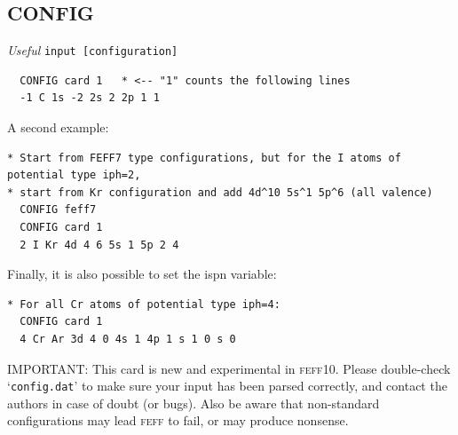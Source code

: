 \documentclass[11pt,oneside]{report} %
\newcommand{\program}[1]{\textsc{#1}}
\newcommand{\feff}{\program{feff}}
\newcommand{\vnum}{10}
\newcommand{\feffcur}{\feff\vnum}
\newenvironment{Card}[4]%
      {\vspace{3ex}%
        \subsection{#1}
        \quad\textsl{#3}\newline
        \quad\texttt{#2}\newline%
        \label{card:#4}\\}
      {}
\newcommand{\file}[1]{`\texttt{#1}'}
\begin{document}
\begin{Card}{CONFIG}{input [configuration]}{Useful}{cfg}
\begin{verbatim}
  CONFIG card 1   * <-- "1" counts the following lines
  -1 C 1s -2 2s 2 2p 1 1
\end{verbatim}
  A second example:
\begin{verbatim} 
* Start from FEFF7 type configurations, but for the I atoms of potential type iph=2, 
* start from Kr configuration and add 4d^10 5s^1 5p^6 (all valence)
  CONFIG feff7
  CONFIG card 1
  2 I Kr 4d 4 6 5s 1 5p 2 4
\end{verbatim}
  Finally, it is also possible to set the ispn variable:
\begin{verbatim}
* For all Cr atoms of potential type iph=4: 
  CONFIG card 1
  4 Cr Ar 3d 4 0 4s 1 4p 1 s 1 0 s 0
\end{verbatim}
  IMPORTANT: This card is new and experimental in {\feffcur}.  Please double-check \file{config.dat} to make sure your input has been parsed correctly, and contact the authors in case of doubt (or bugs).  Also be aware that non-standard configurations may lead {\feff} to fail, or may produce nonsense.
\end{Card}
\end{document}
